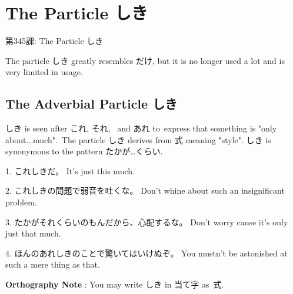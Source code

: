     
\chapter{The Particle しき}

\begin{center}
\begin{Large}
第345課: The Particle しき 
\end{Large}
\end{center}
 
\par{ The particle しき greatly resembles だけ, but it is no longer used a lot and is very limited in usage.  }
      
\section{The Adverbial Particle しき}
 
\par{ しき is seen after これ, それ,  and あれ to express that something is "only about\dothyp{}\dothyp{}\dothyp{}much". The particle しき derives from 式 meaning "style". しき is synonymous to the pattern たかが…くらい. }

\par{1. これしきだ。 \hfill\break
It's just this much. }

\par{2. これしきの問題で弱音を吐くな。 \hfill\break
Don't whine about such an insignificant problem. }

\par{3. たかがそれくらいのもんだから、心配するな。 \hfill\break
Don't worry cause it's only just that much. }

\par{4. ほんのあれしきのことで驚いてはいけぬぞ。 \hfill\break
You mustn't be astonished at such a mere thing as that. }

\par{\textbf{Orthography Note }: You may write しき in 当て字 as 式. }
    